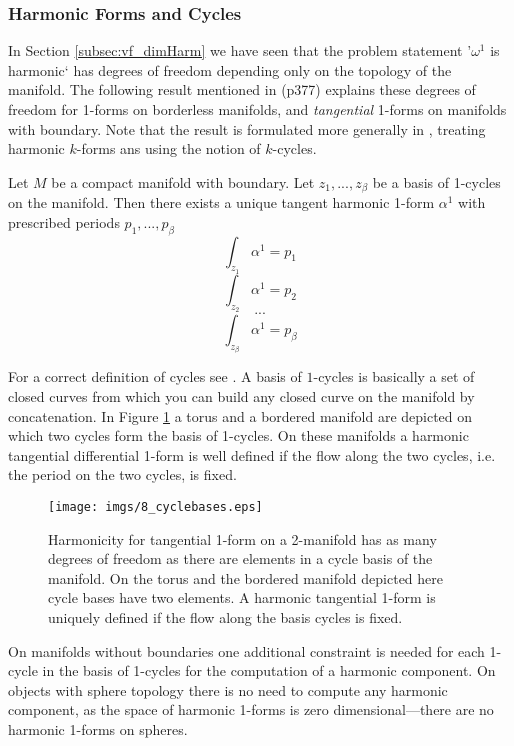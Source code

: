 \subsubsection{Harmonic Forms and Cycles}
In Section \ref{subsec:vf_dimHarm} we have seen that the problem statement '$\omega^1$ is harmonic` has degrees of freedom depending only on the topology of the manifold. The following result mentioned in \cite{FRANKEL11} (p377) explains these degrees of freedom for 1-forms on borderless manifolds, and \emph{tangential} 1-forms on manifolds with boundary. Note that the result is formulated more generally in \cite{FRANKEL11}, treating harmonic $k$-forms ans using the notion of $k$-cycles.

\begin{thm}
Let $M$ be a compact manifold with boundary. Let $z_1,...,z_\beta$ be a basis of 1-cycles on the manifold. Then there exists a unique tangent harmonic 1-form $\alpha^1$ with prescribed periods $p_1,...,p_{\beta}$
\[\int_{z_1}\alpha^1 = p_1\]
\[\int_{z_2}\alpha^1 =p_2\]
\[...\]
\[\int_{z_\beta}\alpha^1 = p_{\beta}\]
\end{thm}

For a correct definition of cycles see \cite{FRANKEL11}. A basis of $1$-cycles is basically a set of closed curves from which you can build any closed curve on the manifold by concatenation. In Figure \ref{fig:fd_cycles} a torus and a bordered manifold are depicted on which two cycles form the basis of 1-cycles. On these manifolds a harmonic tangential differential 1-form is well defined if the flow along the two cycles, i.e. the period on the two cycles, is fixed. 

\begin{figure}%
\begin{center}
\texttt{[image: imgs/8\_cyclebases.eps]}%
\end{center}
\caption{Harmonicity for tangential 1-form on a 2-manifold has as many degrees of freedom as there are elements in a cycle basis of the manifold. %
On the torus and the bordered manifold depicted here cycle bases have two elements.
A harmonic tangential 1-form is uniquely defined if the flow along the basis cycles is fixed. }%
\label{fig:fd_cycles}%
\end{figure}


On manifolds without boundaries one additional constraint is needed for each 1-cycle in the basis of 1-cycles for the computation of a harmonic component. On objects with sphere topology there is no need to compute any harmonic component, as the space of harmonic 1-forms is zero dimensional---there are no harmonic 1-forms on spheres. 

